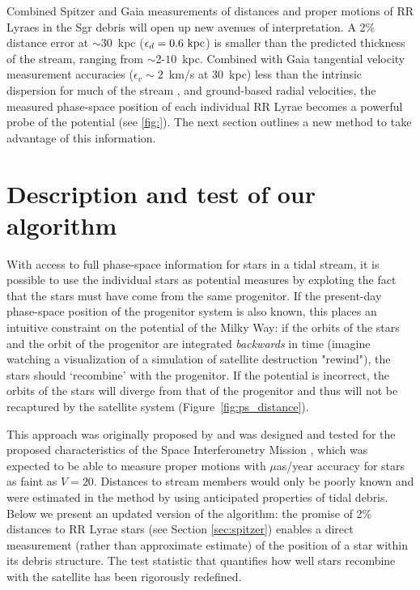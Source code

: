 \documentclass[preprint]{aastex}
\begin{document}
Combined Spitzer and Gaia measurements of distances and proper
motions of RR Lyraes in the Sgr debris will open up new avenues of
interpretation. A 2\% distance error at $\sim$30~kpc ($\epsilon_{d}=0.6~{\rm kpc}$) is smaller than
the predicted thickness of the stream, ranging from
$\sim$2-$10$~kpc. Combined with Gaia tangential velocity measurement
accuracies ($\epsilon_{v}\sim2$~km/s at 30~kpc) less than the intrinsic dispersion
for much of the stream \citep[$\sigma_v\sim10$~km/s;][]{majewski2004}, and ground-based radial
velocities, the measured phase-space
position of each individual RR Lyrae becomes a
powerful probe of the potential (see \ref{fig:}). The next section outlines a new
method to take advantage of this information.

\section{Description and test of our algorithm}
\label{sec:method}
With access to full phase-space information for stars in a tidal
stream, it is possible to use the individual stars as
potential measures by exploting the fact that the stars must have come
from the same progenitor. If the present-day phase-space position of the
progenitor system is also known, this places an intuitive constraint on
the potential of the Milky Way: if the orbits of the stars and the
orbit of the progenitor are integrated \emph{backwards} in time
(imagine watching a visualization of a simulation of satellite destruction "rewind"), the
stars should `recombine' with the progenitor. If the potential is
incorrect, the orbits of the stars will diverge from that of the
progenitor and thus will not be recaptured by the satellite system (Figure~\ref{fig:ps_distance}).

This approach was originally proposed by \citep{jzsh1999} and was designed and tested for the proposed characteristics of the Space Interferometry Mission \citep{unwin??}, which was expected to be able to measure proper motions with $\mu$as/year accuracy for stars as faint as $V=20$. Distances to stream members would only be poorly known and were estimated in the method by using anticipated properties of tidal debris. Below we present an updated version of the algorithm: the promise of 2\% distances to RR Lyrae stars (see Section \ref{sec:spitzer}) enables a direct measurement (rather than approximate estimate) of the position of a star within its debris structure. The test statistic that quantifies how well stars recombine with the satellite has been rigorously redefined.
\end{document}
